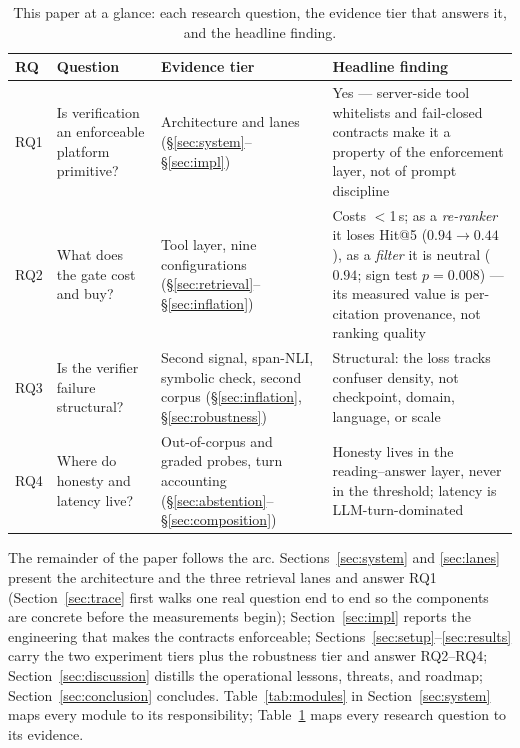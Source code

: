 \documentclass[preprint,12pt]{elsarticle}
\begin{document}
\begin{table}[!htbp]
\centering
\footnotesize
\setlength{\tabcolsep}{3pt}
\caption{This paper at a glance: each research question, the evidence tier
that answers it, and the headline finding.}
\label{tab:ataglance}
\begin{tabular}{p{0.75cm}p{4.0cm}p{2.6cm}p{5.3cm}}
\toprule
RQ & Question & Evidence tier & Headline finding \\
\midrule
RQ1 & Is verification an enforceable platform primitive? & Architecture and
lanes (\S\ref{sec:system}--\S\ref{sec:impl}) & Yes --- server-side tool
whitelists and fail-closed contracts make it a property of the enforcement
layer, not of prompt discipline \\
RQ2 & What does the gate cost and buy? & Tool layer, nine configurations
(\S\ref{sec:retrieval}--\S\ref{sec:inflation}) & Costs $<$1\,s; as a
\emph{re-ranker} it loses Hit@5 ($0.94\!\to\!0.44$), as a \emph{filter} it is
neutral ($0.94$; sign test $p=0.008$) --- its measured value is per-citation
provenance, not ranking quality \\
RQ3 & Is the verifier failure structural? & Second signal, span-NLI, symbolic
check, second corpus (\S\ref{sec:inflation}, \S\ref{sec:robustness}) &
Structural: the loss tracks confuser density, not checkpoint, domain,
language, or scale \\
RQ4 & Where do honesty and latency live? & Out-of-corpus and graded probes,
turn accounting (\S\ref{sec:abstention}--\S\ref{sec:composition}) & Honesty
lives in the reading--answer layer, never in the threshold; latency is
LLM-turn-dominated \\
\bottomrule
\end{tabular}
\end{table}

The remainder of the paper follows the arc.
Sections~\ref{sec:system} and \ref{sec:lanes} present the architecture and
the three retrieval lanes and answer RQ1 (Section~\ref{sec:trace} first walks
one real question end to end so the components are concrete before the
measurements begin); Section~\ref{sec:impl} reports the engineering that makes
the contracts enforceable; Sections~\ref{sec:setup}--\ref{sec:results} carry
the two experiment tiers plus the robustness tier and answer RQ2--RQ4;
Section~\ref{sec:discussion} distills the operational lessons, threats, and
roadmap; Section~\ref{sec:conclusion} concludes.
Table~\ref{tab:modules} in Section~\ref{sec:system} maps every module to its
responsibility; Table~\ref{tab:ataglance} maps every research question to its
evidence.
\end{document}
